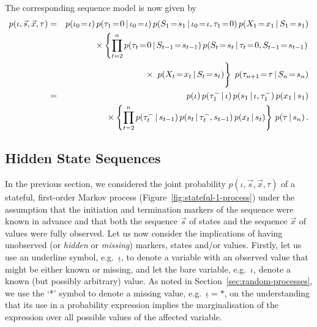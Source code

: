 \documentclass[a4paper]{article}
\newcommand{\ui}{\underline{\iota}}
\newcommand{\tm}{\tau^{-}}
\begin{document}
The corresponding sequence model is now given by
\begin{eqnarray}
p({\iota},\vec{s},\vec{x},{\tau}) & = & 
p(\iota_0\!=\!{\iota})\,p(\tau_1\!=\!0\,|\,\iota_0\!=\!{\iota})
\,p(S_1\!=\!s_1\,|\,\iota_0\!=\!{\iota},\tau_1\!=\!0)
\,p(X_1\!=\!x_1\,|\,S_1\!=\!s_1)
\nonumber\\&&
{}\times\left\{\prod_{t=2}^{n}p(\tau_t\!=\!0\,|\,S_{t-1}\!=\!s_{t-1})
\,p(S_t\!=\!s_t\,|\,\tau_t\!=\!0,S_{t-1}\!=\!s_{t-1})\right.
\nonumber\\&&\hspace*{10mm}{}\times\left.\rule{0pt}{6mm}
\,p(X_t\!=\!x_t\,|\,S_t\!=\!s_t)\right\}
\;p(\tau_{n+1}\!=\!{\tau}\,|\,S_n\!=\!s_n)
\nonumber\\
&=&
p({\iota})\,p(\tm_1\,|\,{\iota})
\,p(s_1\,|\,{\iota},\tm_1)
\,p(x_1\,|\,s_1)
\nonumber\\&&
{}\times\left\{\prod_{t=2}^{n}p(\tm_t\,|\,s_{t-1})
\,p(s_t\,|\,\tm_t,s_{t-1})\,p(x_t\,|\,s_t)\right\}
\,p({\tau}\,|\,s_n)
\,.
\label{eq:stateful-1-model}
\end{eqnarray}

\subsection{Hidden State Sequences}\label{sec:hidden-state}

In the previous section, we considered the joint probability $p({\iota},\vec{s},\vec{x},{\tau})$ of a stateful, first-order Markov process (Figure~\ref{fig:stateful-1-process}) under the assumption that the initiation and termination markers of the sequence were known in advance and that
both the sequence $\vec{s}$ of states and the sequence $\vec{x}$ of values were fully observed.
Let us now consider the implications of having unobserved (or {\em hidden} or {\em missing}) markers, states and/or values.
Firstly, let us use an underline symbol, e.g.\ $\ui$, to denote a variable with an observed value that might be either known or missing, and let the bare variable, e.g.\
$\iota$, denote a known (but possibly arbitrary) value. As noted in Section~\ref{sec:random-processes}, we use the `*' symbol to denote a missing value, e.g.\ $\ui=*$,
on the understanding that its use in a probability expression implies the marginalisation of the expression over all possible values of the affected variable.
\end{document}
